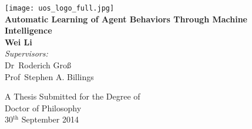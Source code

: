 \begin{titlepage}
\begin{center}


\texttt{[image: uos\_logo\_full.jpg]}~\\[2.0cm]

\textsf{{\Huge \bfseries Automatic Learning of Agent Behaviors Through Machine Intelligence}}~\\[1cm]

\textsf{{\Large \bfseries Wei Li}}~\\[4cm]

{\Large \emph{Supervisors:}~\\
Dr~Roderich Gro\ss~\\
Prof~Stephen A. Billings~\\[1cm]}

{\Large A Thesis Submitted for the Degree of~\\
Doctor of Philosophy}~\\[1cm]

{\Large 30$^\textrm{th}$ September 2014}

\end{center}
\end{titlepage}

